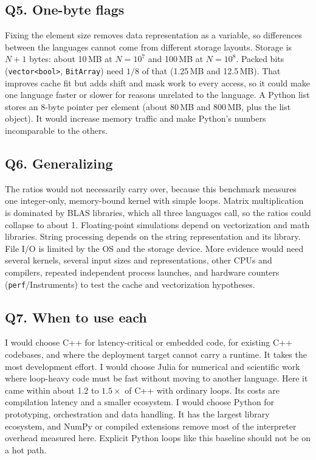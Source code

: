 \documentclass[11pt,a4paper]{article}
\newcommand{\code}[1]{\texttt{#1}}
\newcommand{\tenp}[1]{10^{#1}}
\begin{document}
\subsection*{Q5. One-byte flags}
Fixing the element size removes data representation as a variable, so differences between the
languages cannot come from different storage layouts. Storage is $N+1$ bytes: about 10\,MB at
$N=\tenp{7}$ and 100\,MB at $N=\tenp{8}$. Packed bits (\code{vector<bool>}, \code{BitArray}) need
$1/8$ of that (1.25\,MB and 12.5\,MB). That improves cache fit but adds shift and mask work to every
access, so it could make one language faster or slower for reasons unrelated to the language. A
Python list stores an 8-byte pointer per element (about 80\,MB and 800\,MB, plus the list object).
It would increase memory traffic and make Python's numbers incomparable to the others.

\subsection*{Q6. Generalizing}
The ratios would not necessarily carry over, because this benchmark measures one integer-only,
memory-bound kernel with simple loops. Matrix multiplication is dominated by BLAS libraries, which
all three languages call, so the ratios could collapse to about 1. Floating-point simulations depend
on vectorization and math libraries. String processing depends on the string representation and its
library. File I/O is limited by the OS and the storage device. More evidence would need several
kernels, several input sizes and representations, other CPUs and compilers, repeated independent
process launches, and hardware counters (\code{perf}/Instruments) to test the cache and
vectorization hypotheses.

\subsection*{Q7. When to use each}
I would choose C++ for latency-critical or embedded code, for existing C++ codebases, and where the
deployment target cannot carry a runtime. It takes the most development effort. I would choose Julia
for numerical and scientific work where loop-heavy code must be fast without moving to another
language. Here it came within about 1.2 to $1.5\times$ of C++ with ordinary loops. Its costs are
compilation latency and a smaller ecosystem. I would choose Python for prototyping, orchestration and
data handling. It has the largest library ecosystem, and NumPy or compiled extensions remove most of
the interpreter overhead measured here. Explicit Python loops like this baseline should not be on a
hot path.
\end{document}
